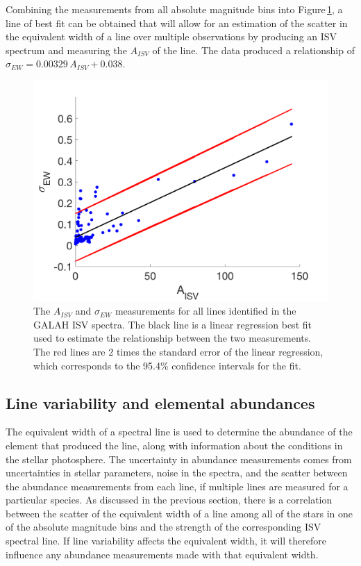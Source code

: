 Combining the measurements from all absolute magnitude bins into Figure\,\ref{figGALAH_AISV_EW}, a line of best fit can be obtained that will allow for an estimation of the scatter in the equivalent width of a line over multiple observations by producing an ISV spectrum and measuring the $A_{ISV}$ of the line. The data produced a relationship of $\sigma_{EW} = 0.00329\,A_{ISV} + 0.038$.

\begin{figure}
    \centering
    \includegraphics[width=.8\textwidth]{GALAH_AISV_EW.png}
    \caption{The $A_{ISV}$ and $\sigma_{EW}$ measurements for all lines identified in the GALAH ISV spectra. The black line is a linear regression best fit used to estimate the relationship between the two measurements. The red lines are 2 times the standard error of the linear regression, which corresponds to the 95.4\% confidence intervals for the fit.}
    \label{figGALAH_AISV_EW}
\end{figure}

\subsection{Line variability and elemental abundances}
\label{secGALAHabundance}
The equivalent width of a spectral line is used to determine 
the abundance of the element that produced the line, along with information about the conditions in the stellar photosphere. The uncertainty in abundance measurements comes from uncertainties in stellar parameters, noise in the spectra, and the scatter between the abundance measurements from each line, if multiple lines are measured for a particular species. As discussed in the previous section, there is a correlation between the scatter of the equivalent width of a line among all of the stars in one of the absolute magnitude bins and the strength of the corresponding ISV spectral line. If line variability affects the equivalent width, it will therefore influence any abundance measurements made with that equivalent width.\\


